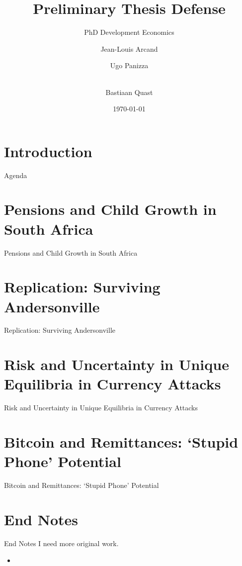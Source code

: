 \documentclass[xcolor=dvipsnames]{beamer}
\title{Preliminary Thesis Defense}
\subtitle{PhD Development Economics}
\author[Bastiaan Quast]{Jean-Louis Arcand\inst{1} \and Ugo Panizza\inst{2} \\~\\ \and Bastiaan Quast\inst{3} }
\institute
{
  \inst{1}
  Professor of Economics\\
  Supervisor
  \and
  \inst{2}
  Professor of Economics\\
  Second Reader
  \and
  \inst{3}
  PhD Student
  \and
  The Graduate Institute, Geneva
}
\date{\today}
\begin{document}
\begin{frame}
  \titlepage
\end{frame}


\section{Introduction}

\begin{frame}{Agenda}
  \tableofcontents
\end{frame}

\section[Pensions and Child Growth]{Pensions and Child Growth in South Africa}

\begin{frame}{Pensions and Child Growth in South Africa}

\end{frame}

\section[Surviving Andersonville]{Replication: Surviving Andersonville}

\begin{frame}{Replication: Surviving Andersonville}

\end{frame}

\section[Uncertainty in Currency Attacks]{Risk and Uncertainty in Unique Equilibria in Currency Attacks}

\begin{frame}{Risk and Uncertainty in Unique Equilibria in Currency Attacks}
\end{frame}

\section[Bitcoin and Remittances]{Bitcoin and Remittances: `Stupid Phone' Potential}

\begin{frame}{Bitcoin and Remittances: `Stupid Phone' Potential}
\end{frame}


\section{End Notes}

\begin{frame}{End Notes}
I need  more \alert{original work}.  
\begin{itemize}
	\item 
\end{itemize}

\end{frame}
\end{document}
